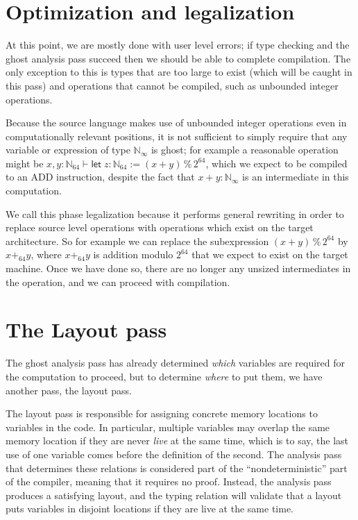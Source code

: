 \documentclass[acmsmall,nonacm]{acmart}
\newcommand*{\N}{\mathbb{N}}
\begin{document}
\section{Optimization and legalization}\label{sec:optimization}

At this point, we are mostly done with user level errors; if type checking and the ghost analysis pass succeed then we should be able to complete compilation. The only exception to this is types that are too large to exist (which will be caught in this pass) and operations that cannot be compiled, such as unbounded integer operations.

Because the source language makes use of unbounded integer operations even in computationally relevant positions, it is not sufficient to simply require that any variable or expression of type $\N_\infty$ is ghost; for example a reasonable operation might be $x,y:\N_{64}\vdash \mathsf{let}\;z:\N_{64}:=(x+y)\mathrel{\%}2^{64}$, which we expect to be compiled to an ADD instruction, despite the fact that $x+y:\N_{\infty}$ is an intermediate in this computation.

We call this phase legalization because it performs general rewriting in order to replace source level operations with operations which exist on the target architecture. So for example we can replace the subexpression $(x+y)\mathrel{\%}2^{64}$ by $x+_{64}y$, where $x+_{64}y$ is addition modulo $2^{64}$ that we expect to exist on the target machine. Once we have done so, there are no longer any unsized intermediates in the operation, and we can proceed with compilation.

\section{The Layout pass}\label{sec:layout}

The ghost analysis pass has already determined \emph{which} variables are required for the computation to proceed, but to determine \emph{where} to put them, we have another pass, the layout pass.

The layout pass is responsible for assigning concrete memory locations to variables in the code. In particular, multiple variables may overlap the same memory location if they are never \emph{live} at the same time, which is to say, the last use of one variable comes before the definition of the second. The analysis pass that determines these relations is considered part of the ``nondeterministic'' part of the compiler, meaning that it requires no proof. Instead, the analysis pass produces a satisfying layout, and the typing relation will validate that a layout puts variables in disjoint locations if they are live at the same time.
\end{document}
